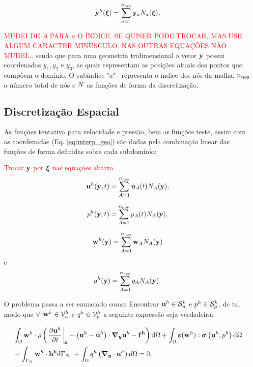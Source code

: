 \documentclass[tese_patricia]{subfiles}%
\begin{document}
\begin{align}
	\mathbf{y}^{h}(\bm{\xi}) = \sum_{a = 1}^{n_{\mathrm{nos}}} \mathbf{y}_{a}N_{a}(\bm{\xi}),  \label{eq:interp_geo}
\end{align}

\textcolor{red}{MUDEI DE $A$ PARA $a$ O ÍNDICE. SE QUISER PODE TROCAR, MAS USE ALGUM CARACTER MINÚSCULO. NAS OUTRAS EQUAÇÕES NÃO MUDEI...}
\noindent sendo que para uma geometria tridimensional o vetor $\mathbf{y}$ possui coordenadas $y_1,y_2$ e $y_3$, as quais representam as posições atuais dos pontos que compõem o domínio. O subíndice "$a$" $ \ $ representa o índice dos nós da malha, $n_{\mathrm{nos}}$ o número total de nós e $N$ as funções de forma da discretização.


\subsection{Discretização Espacial} \label{capitulo:Cap2:DiscEspacial}

As funções tentativa para velocidade e pressão, bem as funções teste, assim com as coordenadas (Eq. \eqref{eq:interp_geo}) são dadas pela combinação linear das funções de forma definidas sobre cada subdomínio:

\textcolor{red}{Trocar $\mathbf{y}$ por $\bm{\xi}$ nas equações abaixo}
\begin{align}
\mathbf{u}^h(\mathbf{y},t) = \sum_{A = 1}^{n_{\mathrm{nos}}} \mathbf{u}_{A}(t)N_{A}(\mathbf{y}), \label{eq:interp_vel}
\end{align}

\begin{align}
p^h(\mathbf{y},t)  = \sum_{A = 1}^{n_{\mathrm{nos}}} p_{A}(t)N_{A}(\mathbf{y}),\label{eq:interp_press} 
\end{align}

\begin{align}
\mathbf{w}^h(\mathbf{y})  = \sum_{A = 1}^{n_{\mathrm{nos}}} \mathbf{w}_{A}N_{A}(\mathbf{y}) \label{eq:interp_utest}
\end{align}
e
\begin{align}
q^h(\mathbf{y})  = \sum_{A = 1}^{n_{\mathrm{nos}}} q_{A}N_{A}(\mathbf{y}). \label{eq:inter_ptest} 
\end{align}

O problema passa a ser enunciado como: Encontrar $\mathbf{u}^h \in \mathcal{S}_u^h$ e $p^h \in \mathcal{S}_p^h$, de tal modo que $\forall$ $\mathbf{w}^h \in \mathcal{V}_u^h$ e $q^h \in \mathcal{V}_p^h$ a seguinte expressão seja verdadeira:

\begin{align}
	\begin{split}
		&\int_{\Omega} \mathbf{w}^h \cdot \rho \left(\left. \frac{\partial\mathbf{u}^h}{\partial t} \right|_{\bar{\mathbf{x}}} + \left(\mathbf{u}^h - \bar{\mathbf{u}}^h \right)\cdot\boldsymbol{\nabla_y} \mathbf{u}^h - \mathbf{f^h} \right) \mathrm{d} \Omega + \int_{\Omega} \bm{\varepsilon}(\mathbf{w}^h) : \boldsymbol{\sigma}\left(\mathbf{u}^h,p^h \right)  \mathrm{d} \Omega\\ & - \int_{\Gamma_{N}} \mathbf{w}^h \cdot \mathbf{h^h} \mathrm{d} \Gamma_{N} \ + \int_{\Omega} q^h \left(\boldsymbol{\nabla_y} \cdot \mathbf{u}^h\right) d \Omega = 0.  \label{eq:QM_C_forma_fraca_1} 
	\end{split}
\end{align}
\end{document}

